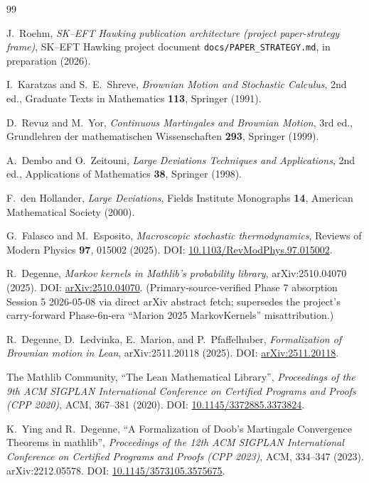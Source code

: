 \documentclass[11pt]{article}
\begin{document}
\begin{thebibliography}{99}

 J.~Roehm,
\emph{SK--EFT Hawking publication architecture (project paper-strategy frame)},
SK--EFT Hawking project document
\texttt{docs/PAPER\_STRATEGY.md}, in preparation (2026).

 I.~Karatzas and S.~E.~Shreve,
\emph{Brownian Motion and Stochastic Calculus}, 2nd ed.,
Graduate Texts in Mathematics \textbf{113}, Springer (1991).

 D.~Revuz and M.~Yor,
\emph{Continuous Martingales and Brownian Motion}, 3rd ed.,
Grundlehren der mathematischen Wissenschaften \textbf{293}, Springer (1999).

 A.~Dembo and O.~Zeitouni,
\emph{Large Deviations Techniques and Applications}, 2nd ed.,
Applications of Mathematics \textbf{38}, Springer (1998).

 F.~den Hollander,
\emph{Large Deviations}, Fields Institute Monographs \textbf{14},
American Mathematical Society (2000).

 G.~Falasco and M.~Esposito,
\emph{Macroscopic stochastic thermodynamics},
Reviews of Modern Physics \textbf{97}, 015002 (2025).
DOI: \href{https://doi.org/10.1103/RevModPhys.97.015002}{10.1103/RevModPhys.97.015002}.

 R.~Degenne,
\emph{Markov kernels in Mathlib's probability library},
arXiv:2510.04070 (2025).
DOI: \href{https://arxiv.org/abs/2510.04070}{arXiv:2510.04070}.
(Primary-source-verified Phase 7 absorption Session 5 2026-05-08
via direct arXiv abstract fetch; supersedes the project's
carry-forward Phase-6n-era ``Marion 2025 MarkovKernels''
misattribution.)

 R.~Degenne, D.~Ledvinka,
E.~Marion, and P.~Pfaffelhuber,
\emph{Formalization of Brownian motion in Lean},
arXiv:2511.20118 (2025).
DOI: \href{https://arxiv.org/abs/2511.20118}{arXiv:2511.20118}.

 The Mathlib Community,
``The Lean Mathematical Library'',
\emph{Proceedings of the 9th ACM SIGPLAN International Conference
on Certified Programs and Proofs (CPP 2020)},
ACM, 367--381 (2020).
DOI: \href{https://doi.org/10.1145/3372885.3373824}{10.1145/3372885.3373824}.

 K.~Ying and R.~Degenne,
``A Formalization of Doob's Martingale Convergence Theorems in mathlib'',
\emph{Proceedings of the 12th ACM SIGPLAN International Conference on
Certified Programs and Proofs (CPP 2023)},
ACM, 334--347 (2023).
arXiv:2212.05578.
DOI: \href{https://doi.org/10.1145/3573105.3575675}{10.1145/3573105.3575675}.

\end{thebibliography}
\end{document}
